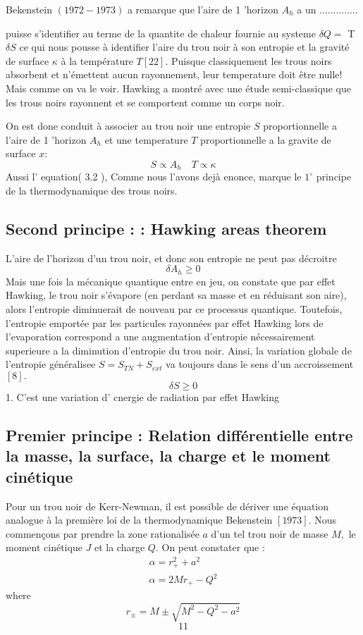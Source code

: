 Bekenstein $(1972-1973)$ a remarque que l'aire de 1 'horizon $A_{h}$ a un
..............

 puisse s'identifier au terme de la quantite de chaleur fournie au systeme $\delta Q=$ T $\delta S$ ce qui nous pousse à identifier l'aire du trou noir à son entropie et la gravité de surface $\kappa$ à la température $T[22] .$ Puisque classiquement les trous noirs absorbent et n'émettent aucun rayonnement, leur temperature doit être nulle! Mais comme on va le voir. Hawking a montré avec une étude semi-classique que les trous noirs rayonnent et se comportent comme un corps noir.

On est done conduit à associer au trou noir une entropie $S$ proportionnelle a l'aire de 1 'horizon $A_{h}$ et une temperature $T$ proportionnelle a la gravite de surface $x:$
$$
S \propto A_{h} \quad T \propto \kappa
$$
Aussi l' equation( 3.2 ), Comme nous l'avons dejà enonce, marque le $1^{\circ}$ principe de la thermodynamique des trous noirs.
\subsection{Second principe : : Hawking areas theorem }
L'aire de l'horizon d'un trou noir, et donc son entropie ne peut pas décroitre
$$
\delta A_{h} \geq 0
$$
Mais une fois la mécanique quantique entre en jeu, on constate que par effet Hawking, le trou noir s'évapore (en perdant sa masse et en réduisant son aire), alors l'entropie diminuerait de nouveau par ce processus quantique. Toutefois, l'entropie emportée par les particules rayonnées par effet Hawking lors de l'evaporation correspond a une augmentation d'entropie nécessairement superieure a la diminution d'entropie du trou noir. Ainsi, la variation globale de l'entropie généralisee $S=S_{T N}+S_{e x t}$ va toujours dans le sens d'un accroissement $[8] .$
$$
\delta S \geq 0
$$
1. C'est une variation d' cnergie de radiation par effet Hawking

\subsection{Premier principe :  Relation différentielle entre la masse, la surface, la charge et le moment cinétique }


Pour un trou noir de Kerr-Newman, il est possible de dériver une équation analogue à la première loi de la thermodynamique Bekenstein $[1973] .$ Nous commençons par prendre la zone rationalisée $a$ d'un tel trou noir de masse $M,$  le moment cinétique $J$ et la charge $Q .$ On peut constater que :
$$
\begin{array}{c}
\alpha=r_{+}^{2}+a^{2} \\
\alpha=2 M r_{+}-Q^{2}
\end{array}
$$
where
$$
r_{\pm}=M \pm \sqrt{M^{2}-Q^{2}-a^{2}}
$$
$$
11
$$



